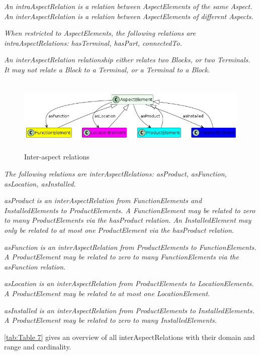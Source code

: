 {\itshape
An intraAspectRelation is a relation between AspectElements of the same Aspect. An interAspectRelation is a relation
between AspectElements of different Aspects.}

{\itshape
When restricted to AspectElements, the following relations are intraAspectRelations: hasTerminal, hasPart,
connectedTo.}

{\itshape
An interAspectRelation relationship either relates two Blocks, or two Terminals. It may not relate a Block to a
Terminal, or a Terminal to a Block.}

\begin{figure}[htb]
  \centering
  \includegraphics[width=6.44424in,height=1.40968in]{img/IMFmanual-img041.png}
  \caption{Inter-aspect relations}
  \label{fig:Figure 22}
\end{figure}

{\itshape
The following relations are interAspectRelations: asProduct, asFunction, asLocation, asInstalled.}

{\itshape
asProduct is an interAspectRelation from FunctionElements and InstalledElements to ProductElements. A FunctionElement
may be related to zero to many ProductElements via the hasProduct relation. An InstalledElement may only be related
to at most one ProductElement via the hasProduct relation.}

{\itshape
asFunction is an interAspectRelation from ProductElements to FunctionElements. A ProductElement may be related to zero
to many FunctionElements via the asFunction relation.}

{\itshape
asLocation is an interAspectRelation from ProductElements to LocationElements. A ProductElement may be related to at
most one LocationElement.}

{\itshape
asInstalled is an interAspectRelation from ProductElements to InstalledElements. A ProductElement may be related to
zero to many InstalledElements. }

\autoref{tab:Table 7} gives an overview of all interAspectRelations with their domain and range and cardinality.

